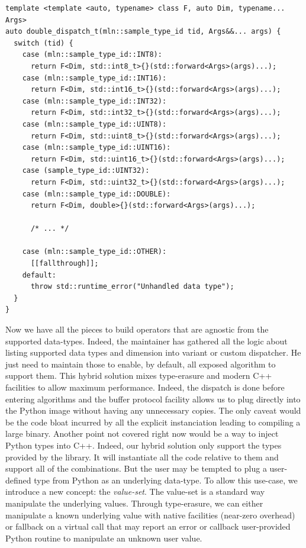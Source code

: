 \begin{verbatim}
template <template <auto, typename> class F, auto Dim, typename... Args>
auto double_dispatch_t(mln::sample_type_id tid, Args&&... args) {
  switch (tid) {
    case (mln::sample_type_id::INT8):
      return F<Dim, std::int8_t>{}(std::forward<Args>(args)...);
    case (mln::sample_type_id::INT16):
      return F<Dim, std::int16_t>{}(std::forward<Args>(args)...);
    case (mln::sample_type_id::INT32):
      return F<Dim, std::int32_t>{}(std::forward<Args>(args)...);
    case (mln::sample_type_id::UINT8):
      return F<Dim, std::uint8_t>{}(std::forward<Args>(args)...);
    case (mln::sample_type_id::UINT16):
      return F<Dim, std::uint16_t>{}(std::forward<Args>(args)...);
    case (sample_type_id::UINT32):
      return F<Dim, std::uint32_t>{}(std::forward<Args>(args)...);
    case (mln::sample_type_id::DOUBLE):
      return F<Dim, double>{}(std::forward<Args>(args)...);

      /* ... */

    case (mln::sample_type_id::OTHER):
      [[fallthrough]];
    default:
      throw std::runtime_error("Unhandled data type");
  }
}
\end{verbatim}

Now we have all the pieces to build operators that are agnostic from the supported data-types. Indeed, the maintainer
has gathered all the logic about listing supported data types and dimension into variant or custom dispatcher. He just
need to maintain those to enable, by default, all exposed algorithm to support them. This hybrid solution mixes
type-erasure and modern C++ facilities to allow maximum performance. Indeed, the dispatch is done before entering
algorithms and the buffer protocol facility allows us to plug directly into the Python image without having any
unnecessary copies. The only caveat would be the code bloat incurred by all the explicit instanciation leading to
compiling a large binary. Another point not covered right now would be a way to inject Python types into C++. Indeed,
our hybrid solution only support the types provided by the library. It will instantiate all the code relative to them
and support all of the combinations. But the user may be tempted to plug a user-defined type from Python as an
underlying data-type. To allow this use-case, we introduce a new concept: the \emph{value-set}. The value-set is a
standard way manipulate the underlying values. Through type-erasure, we can either manipulate a known underlying value
with native facilities (near-zero overhead) or fallback on a virtual call that may report an error or callback
user-provided Python routine to manipulate an unknown user value.

